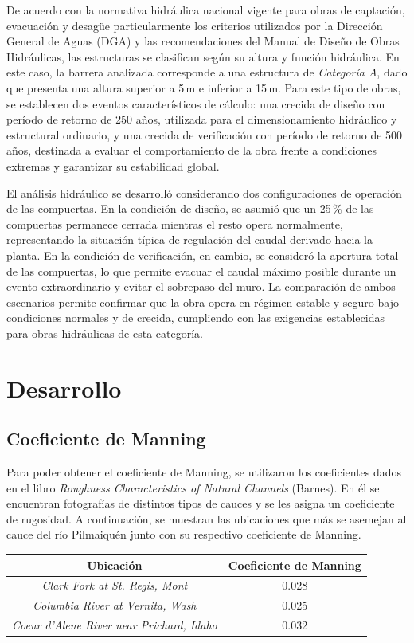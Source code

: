 \documentclass{article} %
\begin{document}
De acuerdo con la normativa hidráulica nacional vigente para obras de captación, evacuación y desagüe particularmente los criterios utilizados por la Dirección General de Aguas (DGA) y las recomendaciones del Manual de Diseño de Obras Hidráulicas, las estructuras se clasifican según su altura y función hidráulica. En este caso, la barrera analizada corresponde a una estructura de \textit{Categoría A}, dado que presenta una altura superior a 5\,m e inferior a 15\,m. Para este tipo de obras, se establecen dos eventos característicos de cálculo: una crecida de diseño con período de retorno de 250 años, utilizada para el dimensionamiento hidráulico y estructural ordinario, y una crecida de verificación con período de retorno de 500 años, destinada a evaluar el comportamiento de la obra frente a condiciones extremas y garantizar su estabilidad global.

El análisis hidráulico se desarrolló considerando dos configuraciones de operación de las compuertas. En la condición de diseño, se asumió que un 25\,\% de las compuertas permanece cerrada mientras el resto opera normalmente, representando la situación típica de regulación del caudal derivado hacia la planta. En la condición de verificación, en cambio, se consideró la apertura total de las compuertas, lo que permite evacuar el caudal máximo posible durante un evento extraordinario y evitar el sobrepaso del muro. La comparación de ambos escenarios permite confirmar que la obra opera en régimen estable y seguro bajo condiciones normales y de crecida, cumpliendo con las exigencias establecidas para obras hidráulicas de esta categoría.

\newpage
\section{Desarrollo}

\subsection{Coeficiente de Manning}

Para poder obtener el coeficiente de Manning, se utilizaron los coeficientes dados en el libro \textit{Roughness Characteristics of Natural Channels} (Barnes). En él se encuentran fotografías de distintos tipos de cauces y se les asigna un coeficiente de rugosidad. A continuación, se muestran las ubicaciones que más se asemejan al cauce del río Pilmaiquén junto con su respectivo coeficiente de Manning.

\begin{table}[h!]
    \centering
    \begin{tabular}{c c}
        \textbf{Ubicación} & \textbf{Coeficiente de Manning} \\
        \hline
        \textit{Clark Fork at St. Regis, Mont} & 0.028 \\ 
        \textit{Columbia River at Vernita, Wash} & 0.025 \\
        \textit{Coeur d'Alene River near Prichard, Idaho} & 0.032 \\\hline
    \end{tabular}
\end{table}
\end{document}
